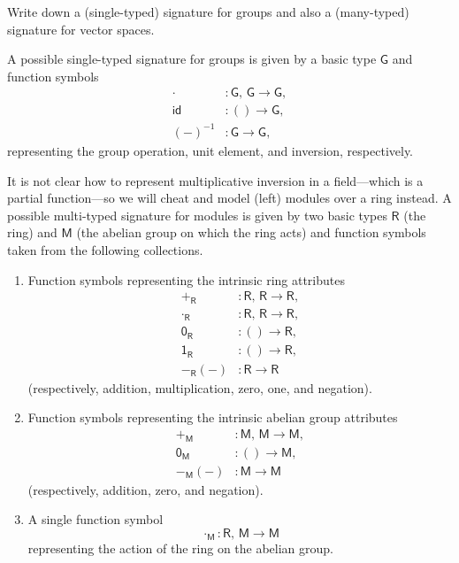 \begin{exercise}
Write down a (single-typed) signature for groups and also a (many-typed) signature for vector spaces.
\end{exercise}

\begin{solution}
A possible single-typed signature for groups is given by a basic type \(\mathsf{G}\) and function symbols
\begin{align*}
\cdot &: \mathsf{G},\, \mathsf{G} \to \mathsf{G}, \\
\mathsf{id} &: () \to \mathsf{G}, \\
\left(-\right)^{-1} &: \mathsf{G} \to \mathsf{G},
\end{align*}
representing the group operation, unit element, and inversion, respectively.
\end{solution}

\begin{solution}
It is not clear how to represent multiplicative inversion in a field---which is a partial function---so we will cheat and model (left) modules over a ring instead.
A possible multi-typed signature for modules is given by two basic types \(\mathsf{R}\) (the ring) and \(\mathsf{M}\) (the abelian group on which the ring acts) and function symbols taken from the following collections.
\begin{enumerate}
\item
Function symbols representing the intrinsic ring attributes
\begin{align*}
\mathsf{+_{\mathsf{R}}} &: \mathsf{R},\, \mathsf{R} \to \mathsf{R}, \\
\mathsf{\cdot_{\mathsf{R}}} &: \mathsf{R},\, \mathsf{R} \to \mathsf{R}, \\
\mathsf{\mathsf{0}_{\mathsf{R}}} &: () \to \mathsf{R}, \\
\mathsf{\mathsf{1}_{\mathsf{R}}} &: () \to \mathsf{R}, \\
-_{\mathsf{R}}\left(-\right) &: \mathsf{R} \to \mathsf{R}
\end{align*}
(respectively, addition, multiplication, zero, one, and negation).
\item
Function symbols representing the intrinsic abelian group attributes
\begin{align*}
\mathsf{+_{\mathsf{M}}} &: \mathsf{M},\, \mathsf{M} \to \mathsf{M}, \\
\mathsf{\mathsf{0}_{\mathsf{M}}} &: () \to \mathsf{M}, \\
-_{\mathsf{M}}\left(-\right) &: \mathsf{M} \to \mathsf{M}
\end{align*}
(respectively, addition, zero, and negation).
\item
A single function symbol
\begin{equation*}
\cdot_{\mathsf{M}} : \mathsf{R},\,\mathsf{M} \to \mathsf{M}
\end{equation*}
representing the action of the ring on the abelian group.
\qedhere
\end{enumerate}
\end{solution}